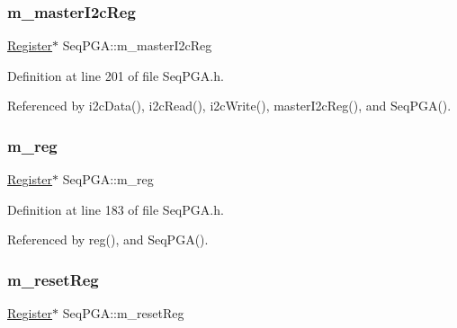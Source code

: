 \mbox{\label{classSeqPGA_a942c71b33a4f43b7a994cb9216abb17e}} 
\subsubsection{\texorpdfstring{m\+\_\+master\+I2c\+Reg}{m\_masterI2cReg}}
{\footnotesize\ttfamily \hyperlink{classRegister}{Register}$\ast$ Seq\+P\+G\+A\+::m\+\_\+master\+I2c\+Reg\hspace{0.3cm}{\ttfamily [private]}}



Definition at line 201 of file Seq\+P\+G\+A.\+h.



Referenced by i2c\+Data(), i2c\+Read(), i2c\+Write(), master\+I2c\+Reg(), and Seq\+P\+G\+A().

\mbox{\label{classSeqPGA_afd827f1d3d55b0a8efafbd79a8c54a52}} 
\subsubsection{\texorpdfstring{m\+\_\+reg}{m\_reg}}
{\footnotesize\ttfamily \hyperlink{classRegister}{Register}$\ast$ Seq\+P\+G\+A\+::m\+\_\+reg\hspace{0.3cm}{\ttfamily [private]}}



Definition at line 183 of file Seq\+P\+G\+A.\+h.



Referenced by reg(), and Seq\+P\+G\+A().

\mbox{\label{classSeqPGA_a8c519e98b992ab872622e95dae4461d8}} 
\subsubsection{\texorpdfstring{m\+\_\+reset\+Reg}{m\_resetReg}}
{\footnotesize\ttfamily \hyperlink{classRegister}{Register}$\ast$ Seq\+P\+G\+A\+::m\+\_\+reset\+Reg\hspace{0.3cm}{\ttfamily [private]}}



